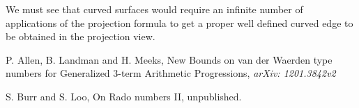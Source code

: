 \documentclass[12pt]{report}
\begin{document}
We must see that curved surfaces would require an infinite number of applications of the projection formula to get a proper well defined curved edge to be obtained in the projection view.



%

\begin{thebibliography}{9}


P. Allen, B. Landman and H. Meeks, New Bounds on van der Waerden type numbers for Generalized $3$-term Arithmetic Progressions, {\it arXiv: 1201.3842v2}


S. Burr and S. Loo, On Rado numbers II, unpublished.

\end{thebibliography}
\end{document}
